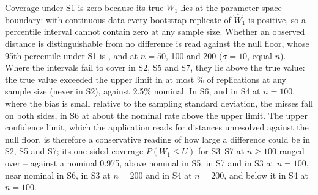 \documentclass[AMA,Times1COL]{WileyNJDv5}
\begin{document}
Coverage under S1 is zero because its true $W_1$ lies at the parameter space boundary: with continuous data every bootstrap replicate of $\widehat{W}_1$ is positive, so a percentile interval cannot contain zero at any sample size. Whether an observed distance is distinguishable from no difference is read against the null floor, whose 95th percentile under S1 is ,  and  at $n = 50$, 100 and 200 ($\sigma = 10$, equal $n$). Where the intervals fail to cover in S2, S5 and S7, they lie above the true value: the true value exceeded the upper limit in at most \% of replications at any sample size (never in S2), against 2.5\% nominal. In S6, and in S4 at $n = 100$, where the bias is small relative to the sampling standard deviation, the misses fall on both sides, in S6 at about the nominal rate above the upper limit. The upper confidence limit, which the application reads for distances unresolved against the null floor, is therefore a conservative reading of how large a difference could be in S2, S5 and S7; its one-sided coverage $P(W_1 \leq U)$ for S3--S7 at $n \geq 100$ ranged over -- against a nominal 0.975, above nominal in S5, in S7 and in S3 at $n = 100$, near nominal in S6, in S3 at $n = 200$ and in S4 at $n = 200$, and below it in S4 at $n = 100$.
\end{document}

